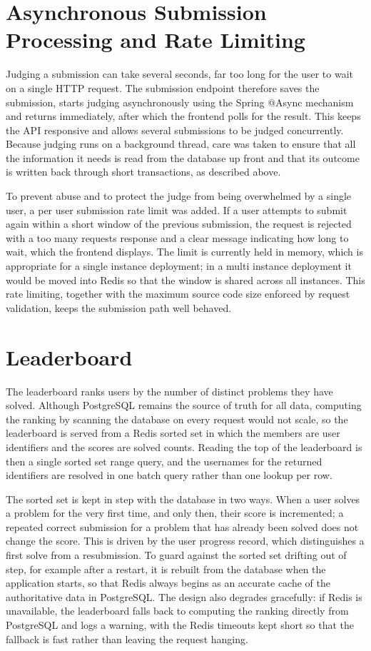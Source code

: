\documentclass[12pt,a4paper]{report}
\begin{document}
\section*{Asynchronous Submission Processing and Rate Limiting}
Judging a submission can take several seconds, far too long for the user to wait on a single HTTP request. The submission endpoint therefore saves the submission, starts judging asynchronously using the Spring {\ttfamily @Async} mechanism and returns immediately, after which the frontend polls for the result. This keeps the API responsive and allows several submissions to be judged concurrently. Because judging runs on a background thread, care was taken to ensure that all the information it needs is read from the database up front and that its outcome is written back through short transactions, as described above.

To prevent abuse and to protect the judge from being overwhelmed by a single user, a per user submission rate limit was added. If a user attempts to submit again within a short window of the previous submission, the request is rejected with a too many requests response and a clear message indicating how long to wait, which the frontend displays. The limit is currently held in memory, which is appropriate for a single instance deployment; in a multi instance deployment it would be moved into Redis so that the window is shared across all instances. This rate limiting, together with the maximum source code size enforced by request validation, keeps the submission path well behaved.

\section*{Leaderboard}
The leaderboard ranks users by the number of distinct problems they have solved. Although PostgreSQL remains the source of truth for all data, computing the ranking by scanning the database on every request would not scale, so the leaderboard is served from a Redis sorted set in which the members are user identifiers and the scores are solved counts. Reading the top of the leaderboard is then a single sorted set range query, and the usernames for the returned identifiers are resolved in one batch query rather than one lookup per row.

The sorted set is kept in step with the database in two ways. When a user solves a problem for the very first time, and only then, their score is incremented; a repeated correct submission for a problem that has already been solved does not change the score. This is driven by the user progress record, which distinguishes a first solve from a resubmission. To guard against the sorted set drifting out of step, for example after a restart, it is rebuilt from the database when the application starts, so that Redis always begins as an accurate cache of the authoritative data in PostgreSQL. The design also degrades gracefully: if Redis is unavailable, the leaderboard falls back to computing the ranking directly from PostgreSQL and logs a warning, with the Redis timeouts kept short so that the fallback is fast rather than leaving the request hanging.
\end{document}
